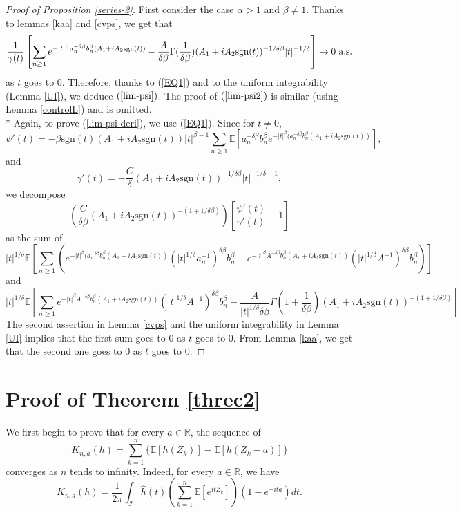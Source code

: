 \documentclass[oneside, a4paper,11pt,reqno]{amsart}
\begin{document}
\begin{proof}[Proof of Proposition \ref{series-2}]
First consider the case $\alpha>1$ and $\beta\neq1$. Thanks to 
lemmas \ref{kaa} and \ref{cvps}, we get that  
$$\frac 1{\gamma(t)}\left[\sum_{n\ge 1}  e^{-|t|^\beta a_n^{-\delta\beta}b_n^\beta(A_1+iA_2 
\text{sgn} (t))} -  \frac{A}{\delta\beta} \Gamma(\frac{1}{\delta\beta}) (A_1+iA_2 \text{sgn} (t))^{-1/\delta\beta} |t|^{-1/\delta} \right]   
\rightarrow 0\ \mbox{\rm a.s.}$$
 as $t$ goes to $0$.
Therefore, thanks to (\ref{EQ1}) and to the uniform integrability (Lemma \ref{UI}), we  
deduce $(\ref{lim-psi})$. The proof of $(\ref{lim-psi2})$ is similar (using Lemma \ref{controlL}) 
and is omitted. \\*
Again, to prove (\ref{lim-psi-deri}), we use (\ref{EQ1}). Since for $t\neq 0$,
$$\psi'(t)=- \beta\text{sgn}(t)  (A_1 +i A_2\text{sgn}(t)   ) |t|^{\beta-1}  \sum_{n\ge 1} 
 {\mathbb E}\left[ a_n^{-\delta\beta} b_n^\beta e^{-|t|^\beta 
    (a_n^{-\delta\beta}b_n^\beta (A_1+i A_2\text{sgn}(t) )} \right],$$ 
and
$$\gamma'(t)=- \frac{C}{\delta}  (A_1 +i A_2\text{sgn}(t))^{-1/\delta\beta} |t|^{-1/\delta-1},$$
  we decompose 
  $$\left(\frac{C}{\delta\beta}  (A_1 +i A_2\text{sgn}(t))^{-(1+1/\delta\beta)}\right)\left[\frac {\psi'(t)}{\gamma'(t)}-1\right]$$ as the sum of 
$$|t|^{1/\delta}  
 {\mathbb E}\left[ \sum_{n\ge 1} \left(e^{-|t|^\beta(a_n^{-\delta\beta}
      b_n^\beta (A_1+iA_2 \text{sgn} (t))}(|t|^{1/\delta} a_n^{-1})^{\delta\beta}b_n^{\beta}
-  e^{-|t|^\beta A^{-\delta\beta}b_n^{\beta} (A_1+iA_2 \text{sgn} (t))}  
   (|t|^{1/\delta} A^{-1})^{\delta\beta} b_n^{\beta}\right) \right]$$
   and
$$|t|^{1/\delta}{\mathbb E}\left[ \sum_{n\ge 1}  e^{-|t|^\beta A^{-\delta\beta}b_n^\beta (A_1+iA_2 \text{sgn} (t))}  
   (|t|^{1/\delta} A^{-1})^{\delta\beta} b_n^{\beta} - \frac{A}{|t|^{1/\delta}\delta\beta} \Gamma(1+\frac{1}{\delta\beta})(A_1 +i A_2\text{sgn}(t))^{-(1+1/\delta\beta)} \right]$$
The second assertion in Lemma \ref{cvps} and the uniform integrability in Lemma \ref{UI} implies that the first sum goes to 0 as $t$ goes to 0.
From Lemma \ref{kaa}, we get that the second one goes to 0 as  $t$ goes to 0. 
\end{proof}
\section{Proof of Theorem \ref{threc2} }
\noindent We first begin to prove that for every $a\in \mathbb{R}$,  the sequence of
$$K_{n,a}(h)= \sum_{k=1}^n\{  \mathbb{E} [h(Z_k)] - \mathbb{E} [h(Z_k-a)]\} $$ 
converges as $n$ tends to infinity.
Indeed, for every $a\in\mathbb{R}$, we have
\begin{equation}\label{int-1} 
K_{n,a}(h)= \frac{1}{2\pi} \int_{\mathcal I} \hat{h} (t) \left(\sum_{k=1}^n \mathbb{E} [e^{i t Z_k} ] \right) \left( 1- e^{-ita} \right) dt.
\end{equation}
\end{document}
